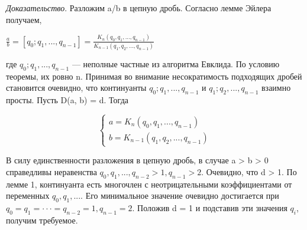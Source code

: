 \documentclass[12pt]{article}
\begin{document}
\textit{Доказательство}. Разложим a/b в цепную дробь. Согласно лемме Эйлера получаем,\par

$\frac{a}{b} = [q_0; q_1,...,q_{n-1}]=\frac{K_{n}(q_0,q_1,...,q_{n-1})}{K_{n-1}(q_1,q_2,...,q_{n-1})}$\par
где $q_0; q_1,...,q_{n-1}$ — неполные частные из алгоритма Евклида. По условию теоремы, их ровно n. Принимая во внимание несократимость подходящих
дробей становится очевидно, что континуанты $q_0; q_1,...,q_{n-1}$ и $q_1; q_2,...,q_{n-1}$ взаимно просты. Пусть
D(a, b) = d. Тогда\par

\begin{equation}
    \begin{cases}
    a = K_{n}(q_0,q_1,...,q_{n-1})
    \\
    b = K_{n-1}(q_1,q_2,...,q_{n-1})
    \end{cases}
\end{equation}

В силу единственности разложения в цепную дробь, в
случае a > b > 0 справедливы неравенства $q_0,q_1,...,q_{n-2} > 1, q_{n−1} > 2$.
Очевидно, что d > 1. По лемме 1, континуанта есть многочлен с неотрицательными коэффициентами от переменных $q_0,q_1,...$. Его минимальное
значение очевидно достигается при $q_0 = q_1 = · · · = q_{n−2} = 1, q_{n−1} = 2$. Положив d = 1 и подставив эти значения $q_i$, получим требуемое.
\end{document}

